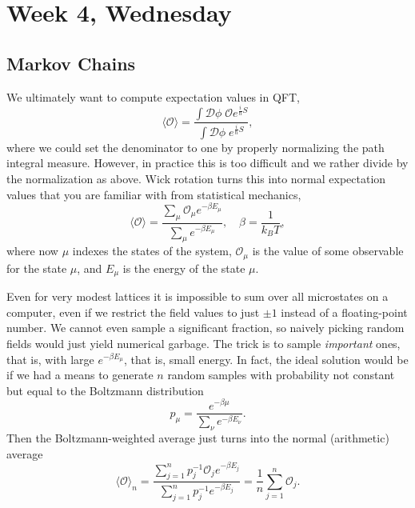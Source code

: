 \documentclass[12pt]{article}
\begin{document}
\section{Week 4, Wednesday}

\subsection{Markov Chains}

We ultimately want to compute expectation values in QFT,
\begin{equation}
  \langle\mathcal{O}\rangle = 
  \frac{
    \int \mathcal{D}\phi \; \mathcal{O} e^{\frac{i}{\hbar}S}
  }{
    \int \mathcal{D}\phi \; e^{\frac{i}{\hbar}S}
  },
\end{equation}
where we could set the denominator to one by properly normalizing the
path integral measure. However, in practice this is too difficult and
we rather divide by the normalization as above. Wick rotation turns
this into normal expectation values that you are familiar with from
statistical mechanics,
\begin{equation}
  \langle\mathcal{O}\rangle = 
  \frac{
    \sum_\mu \mathcal{O}_\mu e^{-\beta E_\mu}
  }{
    \sum_\mu e^{-\beta E_\mu}
  }
  ,\quad
  \beta = \frac{1}{k_B T},
\end{equation}
where now $\mu$ indexes the states of the system, $\mathcal{O}_\mu$ is
the value of some observable for the state $\mu$, and $E_\mu$ is the
energy of the state $\mu$.

Even for very modest lattices it is impossible to sum over all
microstates on a computer, even if we restrict the field values to
just $\pm 1$ instead of a floating-point number. We cannot even sample
a significant fraction, so naively picking random fields would just
yield numerical garbage. The trick is to sample \emph{important} ones,
that is, with large $e^{-\beta E_\mu}$, that is, small energy. In
fact, the ideal solution would be if we had a means to generate $n$
random samples with probability not constant but equal to the
Boltzmann distribution
\begin{equation}
  p_\mu = \frac{e^{-\beta\mu}}{\sum_\nu e^{-\beta E_\nu}}.
\end{equation}
Then the Boltzmann-weighted average just turns into the normal
(arithmetic) average 
\begin{equation}
  \langle \mathcal{O} \rangle_n = 
  \frac{
    \sum_{j=1}^n p_j^{-1} \mathcal{O}_j e^{-\beta E_j}
  }{
    \sum_{j=1}^n p_j^{-1} e^{-\beta E_j}
  }
  = \frac{1}{n} \sum_{j=1}^n \mathcal{O}_j.
\end{equation}
\end{document}
